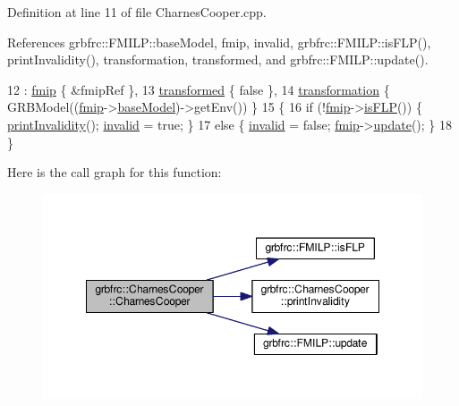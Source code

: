 Definition at line 11 of file Charnes\+Cooper.\+cpp.



References grbfrc\+::\+F\+M\+I\+L\+P\+::base\+Model, fmip, invalid, grbfrc\+::\+F\+M\+I\+L\+P\+::is\+F\+L\+P(), print\+Invalidity(), transformation, transformed, and grbfrc\+::\+F\+M\+I\+L\+P\+::update().


\begin{DoxyCode}
12              : \hyperlink{classgrbfrc_1_1CharnesCooper_a107817ee13698551fae6263c8849f730}{fmip} \{ &fmipRef \},
13                \hyperlink{classgrbfrc_1_1CharnesCooper_a9a0d42480205cfd0f380e104ba83f24e}{transformed} \{ \textcolor{keyword}{false} \},
14                \hyperlink{classgrbfrc_1_1CharnesCooper_a9107f891576f27501e5f103dca964359}{transformation} \{ GRBModel((\hyperlink{classgrbfrc_1_1CharnesCooper_a107817ee13698551fae6263c8849f730}{fmip}->\hyperlink{classgrbfrc_1_1FMILP_a587e886dcaa1ece325a7f283100182a8}{baseModel})->getEnv()) \}
15  \{
16   \textcolor{keywordflow}{if} (!\hyperlink{classgrbfrc_1_1CharnesCooper_a107817ee13698551fae6263c8849f730}{fmip}->\hyperlink{classgrbfrc_1_1FMILP_a4a7dfcc68142d75ef7d19c9856658f59}{isFLP}()) \{ \hyperlink{classgrbfrc_1_1CharnesCooper_a7fd7dab1c9c2b07684f632ec760ce254}{printInvalidity}(); \hyperlink{classgrbfrc_1_1CharnesCooper_a4aaa78ed310e18365a3ec113079b3cd2}{invalid} = \textcolor{keyword}{true}; \}
17   \textcolor{keywordflow}{else} \{ \hyperlink{classgrbfrc_1_1CharnesCooper_a4aaa78ed310e18365a3ec113079b3cd2}{invalid} = \textcolor{keyword}{false}; \hyperlink{classgrbfrc_1_1CharnesCooper_a107817ee13698551fae6263c8849f730}{fmip}->\hyperlink{classgrbfrc_1_1FMILP_ace026c6b2263f7f223eb7fd913f2e269}{update}(); \}
18  \}
\end{DoxyCode}


Here is the call graph for this function\+:
\nopagebreak
\begin{figure}[H]
\begin{center}
\leavevmode
\includegraphics[width=348pt]{classgrbfrc_1_1CharnesCooper_ae4d0123b4534f7447ddd27ad5273e94b_cgraph}
\end{center}
\end{figure}




